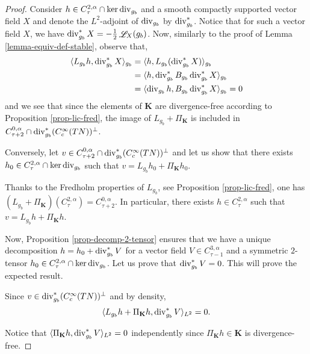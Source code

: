 \documentclass[a4paper,11pt,reqno]{amsart}
\def\div{\mathop{\rm div}\nolimits}
\def\Li{\mathop{\rm \mathscr{L}}\nolimits}
\def\div{\mathop{\rm div}\nolimits}
\def\Li{\mathop{\rm \mathscr{L}}\nolimits}
\numberwithin{equation}{section}
\begin{document}
\begin{proof}
Consider $h\in C^{2,\alpha}_{\tau}\cap \ker\div_{g_b}$ and a smooth compactly supported vector field $X$ and denote the $L^2$-adjoint of $\div_{g_b}$ by $\div^{\ast}_{g_b}$. Notice that for such a vector field $X$, we have $\div^*_{g_b}X=-\frac{1}{2}\Li_X(g_b)$. Now, similarly to the proof of Lemma \ref{lemma-equiv-def-stable}, observe that,
\begin{align}
    \langle L_{g_b}h,\div^*_{g_b}X \rangle_{g_b} &= \langle h,L_{g_b}(\div^*_{g_b}X) \rangle_{g_b}\\
    &=\langle h,\div^*_{g_b}B_{g_b}\div^*_{g_b}X \rangle_{g_b}\\
    &=\langle \div_{g_b}h,B_{g_b}\div^*_{g_b}X \rangle_{g_b} = 0
\end{align}
and we see that since the elements of $\mathbf{K}$ are divergence-free according to Proposition \ref{prop-lic-fred}, the image of $L_{g_b} + \Pi_{\mathbf{K}}$ is included in $C^{0,\alpha}_{\tau+2}\cap \div^*_{g_b}(C^\infty_c(TN))^\perp$.

Conversely, let $v\in C^{0,\alpha}_{\tau+2}\cap \div^*_{g_b}(C^\infty_c(TN))^\perp$ and let us show that there exists $h_0\in C^{2,\alpha}_{\tau}\cap \ker\div_{g_b}$ such that $v=L_{g_b}h_0+\Pi_{\mathbf{K}}h_0$. 

Thanks to the Fredholm properties of $L_{g_b}$, see Proposition \ref{prop-lic-fred}, one has $(L_{g_b} + \Pi_{\mathbf{K}})(C^{2,\alpha}_{\tau}) = C^{0,\alpha}_{\tau+2}$. 
In particular, there exists $h\in C^{2,\alpha}_{\tau}$ such that $v=L_{g_b}h + \Pi_{\mathbf{K}}h$.

Now, Proposition \ref{prop-decomp-2-tensor} ensures that we have a unique decomposition $h = h_0 + \div^*_{g_b}V$ for a vector field $V\in C^{3,\alpha}_{\tau-1}$ and a symmetric $2$-tensor $h_0\in C^{2,\alpha}_{\tau}\cap \ker\div_{g_b}$. Let us prove that $\div^*_{g_b}V=0$. This will prove the expected result.

Since $v\in  \div^*_{g_b}(C^\infty_c(TN))^\perp$ and by density,
$$\langle L_{g_b}h+\Pi_{\mathbf{K}}h,\div^{*}_{g_b}V\rangle_{L^2}=0.$$

Notice that $\langle \Pi_{\mathbf{K}}h,\div^{*}_{g_b}V\rangle_{L^2}=0$ independently since $\Pi_{\mathbf{K}}h\in \mathbf{K}$ is divergence-free.
 

\end{proof}
\end{document}
